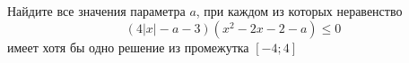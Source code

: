 \begin{ex}
	\begin{condition}
		Найдите все значения параметра \( a \), при каждом из которых неравенство \[ (4|x|-a-3)(x^2-2x-2-a)\le0 \] имеет хотя бы одно решение из промежутка \( [-4;4] \)
	\end{condition}
	\answer{\( [-3;22] \)}
\end{ex}